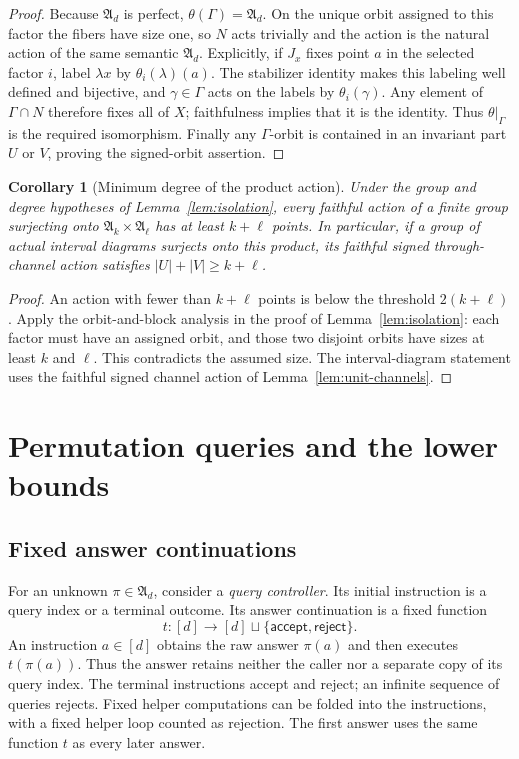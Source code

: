 \documentclass[11pt,a4paper]{article}
\newtheorem{corollary}[theorem]{Corollary}
\theoremstyle{definition}
\theoremstyle{remark}
\newcommand{\Alt}{\mathfrak A}
\newcommand{\acc}{\mathsf{accept}}
\newcommand{\rej}{\mathsf{reject}}
\begin{document}
\begin{proof}
Because $\Alt_d$ is perfect, $\theta(\Gamma)=\Alt_d$. On the unique
orbit assigned to this factor the fibers have size one, so $N$ acts
trivially and the action is the natural action of the same semantic
$\Alt_d$. Explicitly, if $J_x$ fixes point $a$ in the selected
factor $i$, label $\lambda x$ by $\theta_i(\lambda)(a)$. The
stabilizer identity makes this labeling well defined and bijective,
and $\gamma\in\Gamma$ acts on the labels by
$\theta_i(\gamma)$. Any element of $\Gamma\cap N$ therefore fixes all of $X$;
faithfulness implies that it is the identity. Thus
$\theta|_\Gamma$ is the required isomorphism. Finally any
$\Gamma$-orbit is contained in an invariant part $U$ or $V$, proving
the signed-orbit assertion.
\end{proof}

\begin{corollary}[Minimum degree of the product action]\label{cor:product-capacity}
Under the group and degree hypotheses of
Lemma~\ref{lem:isolation}, every faithful action of a finite group
surjecting onto $\Alt_k\times\Alt_\ell$ has at least $k+\ell$ points.
In particular, if a group of actual interval diagrams surjects onto
this product, its faithful signed through-channel action satisfies
$|U|+|V|\ge k+\ell$.
\end{corollary}
\begin{proof}
An action with fewer than $k+\ell$ points is below the threshold
$2(k+\ell)$. Apply the orbit-and-block analysis in the proof of
Lemma~\ref{lem:isolation}: each factor must have an assigned orbit,
and those two disjoint orbits have sizes at least $k$ and $\ell$.
This contradicts the assumed size. The interval-diagram statement
uses the faithful signed channel action of
Lemma~\ref{lem:unit-channels}.
\end{proof}


\section{Permutation queries and the lower bounds}\label{sec:lower}

\subsection{Fixed answer continuations}

For an unknown $\pi\in\Alt_d$, consider a \emph{query controller}.
Its initial instruction is a query index or a terminal outcome. Its
answer continuation is a fixed function
\[
 t:[d]\longrightarrow[d]\sqcup\{\acc,\rej\}.
\]
An instruction $a\in[d]$ obtains the raw answer $\pi(a)$ and then
executes $t(\pi(a))$. Thus the answer retains neither the caller nor
a separate copy of its query index. The terminal instructions accept
and reject; an infinite sequence of queries rejects. Fixed helper
computations can be folded into the instructions, with a fixed helper
loop counted as rejection. The first answer uses the same function
$t$ as every later answer.
\end{document}
